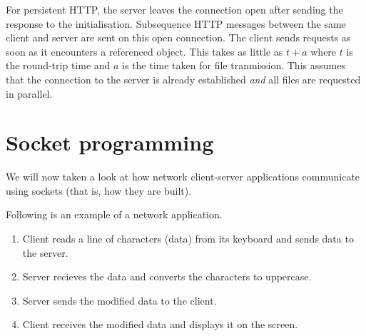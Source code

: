 For persistent HTTP, the server leaves the connection open after sending the response to the initialisation. 
Subsequence HTTP messages between the same client and server are sent on this open connection. The client sends requests as soon as it encounters a referenced object. 
This takes as little as $t + a$ where $t$ is the round-trip time and $a$ is the time taken for file tranmission. 
This assumes that the connection to the server is already established \emph{and} all files are requested in parallel.

\section{Socket programming}

We will now taken a look at how network client-server applications communicate using sockets (that is, how they are built). 

\begin{example}[]
    Following is an example of a network application.
    \begin{enumerate}
        \item Client reads a line of characters (data) from its keyboard and sends data to the server.
        \item Server recieves the data and converts the characters to uppercase.
        \item Server sends the modified data to the client.
        \item Client receives the modified data and displays it on the screen.
    \end{enumerate}
\end{example}


